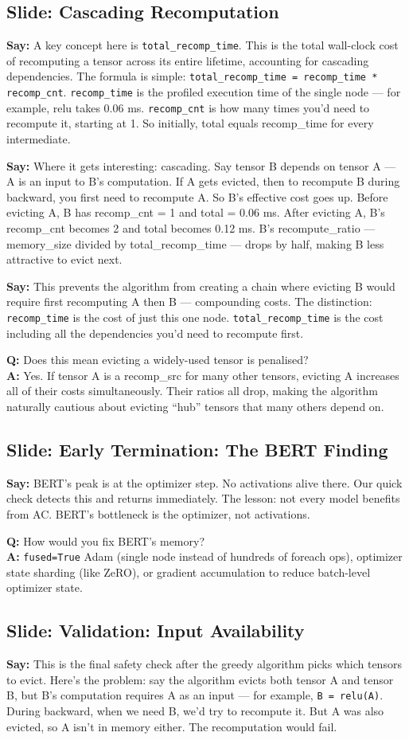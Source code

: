 \documentclass[11pt]{article}
\newcommand{\slide}[1]{\subsection*{Slide: #1}}
\newcommand{\say}[1]{\textbf{Say:} #1}
\newcommand{\qa}[2]{\textcolor{question}{\textbf{Q:} #1} \\ \textbf{A:} #2}
\begin{document}
\slide{Cascading Recomputation}
\say{A key concept here is \texttt{total\_recomp\_time}. This is the total wall-clock cost of recomputing a tensor across its entire lifetime, accounting for cascading dependencies. The formula is simple: \texttt{total\_recomp\_time = recomp\_time * recomp\_cnt}. \texttt{recomp\_time} is the profiled execution time of the single node --- for example, relu takes 0.06 ms. \texttt{recomp\_cnt} is how many times you'd need to recompute it, starting at 1. So initially, total equals recomp\_time for every intermediate.}

\say{Where it gets interesting: cascading. Say tensor B depends on tensor A --- A is an input to B's computation. If A gets evicted, then to recompute B during backward, you first need to recompute A. So B's effective cost goes up. Before evicting A, B has recomp\_cnt = 1 and total = 0.06 ms. After evicting A, B's recomp\_cnt becomes 2 and total becomes 0.12 ms. B's recompute\_ratio --- memory\_size divided by total\_recomp\_time --- drops by half, making B less attractive to evict next.}

\say{This prevents the algorithm from creating a chain where evicting B would require first recomputing A then B --- compounding costs. The distinction: \texttt{recomp\_time} is the cost of just this one node. \texttt{total\_recomp\_time} is the cost including all the dependencies you'd need to recompute first.}

\qa{Does this mean evicting a widely-used tensor is penalised?}{Yes. If tensor A is a recomp\_src for many other tensors, evicting A increases all of their costs simultaneously. Their ratios all drop, making the algorithm naturally cautious about evicting ``hub'' tensors that many others depend on.}

\slide{Early Termination: The BERT Finding}
\say{BERT's peak is at the optimizer step. No activations alive there. Our quick check detects this and returns immediately. The lesson: not every model benefits from AC. BERT's bottleneck is the optimizer, not activations.}

\qa{How would you fix BERT's memory?}{\texttt{fused=True} Adam (single node instead of hundreds of foreach ops), optimizer state sharding (like ZeRO), or gradient accumulation to reduce batch-level optimizer state.}

\slide{Validation: Input Availability}
\say{This is the final safety check after the greedy algorithm picks which tensors to evict. Here's the problem: say the algorithm evicts both tensor A and tensor B, but B's computation requires A as an input --- for example, \texttt{B = relu(A)}. During backward, when we need B, we'd try to recompute it. But A was also evicted, so A isn't in memory either. The recomputation would fail.}
\end{document}
